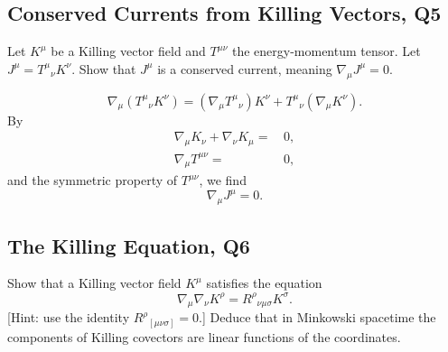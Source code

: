 \subsection{Conserved Currents from Killing Vectors, Q5}

Let $K^\mu$ be a Killing vector field and $T^{\mu\nu}$ the energy-momentum tensor. Let $J^\mu = T^\mu{}_\nu K^\nu$. Show that $J^\mu$ is a conserved current, meaning $\nabla_\mu J^\mu = 0$.
\begin{solution}
    \begin{equation}
        \nabla_\mu(T^\mu{}_\nu K^\nu) = (\nabla_\mu T^\mu{}_\nu )K^\nu + T^\mu{}_\nu(\nabla_\mu K^\nu).
    \end{equation}
    By 
    \begin{align}
        \nabla_\mu K_\nu + \nabla_\nu K_\mu =& \,0,\\
        \nabla_\mu T^{\mu\nu}=&\,0,
    \end{align}
    and the symmetric property of $T^{\mu\nu}$, we find
    \begin{equation}
        \nabla_\mu J^\mu = 0.
    \end{equation}
\end{solution}

\subsection{The Killing Equation, Q6}

Show that a Killing vector field $K^\mu$ satisfies the equation
\begin{equation}
    \nabla_\mu\nabla_\nu K^\rho = R^\rho{}_{\nu\mu\sigma}K^\sigma.
\end{equation}
[Hint: use the identity $R^\rho{}_{[\mu\nu\sigma]}=0$.] Deduce that in Minkowski spacetime the components of Killing covectors are linear functions of the coordinates.


